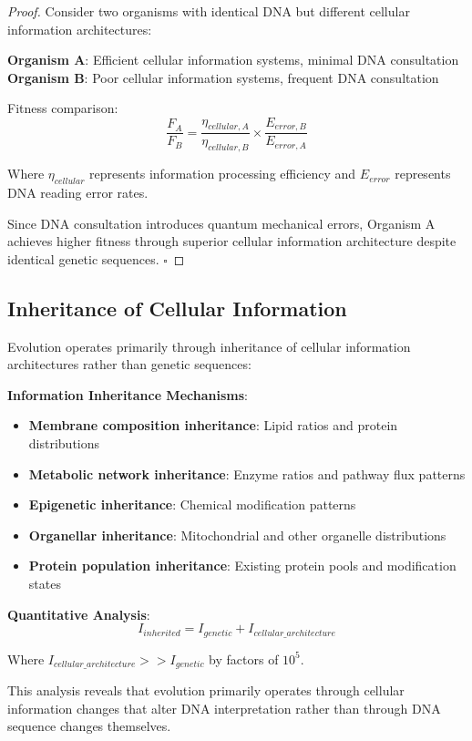 \documentclass[12pt,a4paper]{article}
\begin{document}
\begin{proof}
Consider two organisms with identical DNA but different cellular information architectures:

\textbf{Organism A}: Efficient cellular information systems, minimal DNA consultation
\textbf{Organism B}: Poor cellular information systems, frequent DNA consultation

Fitness comparison:
$$\frac{F_A}{F_B} = \frac{\eta_{cellular,A}}{\eta_{cellular,B}} \times \frac{E_{error,B}}{E_{error,A}}$$

Where $\eta_{cellular}$ represents information processing efficiency and $E_{error}$ represents DNA reading error rates.

Since DNA consultation introduces quantum mechanical errors, Organism A achieves higher fitness through superior cellular information architecture despite identical genetic sequences. $\square$
\end{proof}

\subsection{Inheritance of Cellular Information}

Evolution operates primarily through inheritance of cellular information architectures rather than genetic sequences:

\textbf{Information Inheritance Mechanisms}:
\begin{itemize}
\item \textbf{Membrane composition inheritance}: Lipid ratios and protein distributions
\item \textbf{Metabolic network inheritance}: Enzyme ratios and pathway flux patterns
\item \textbf{Epigenetic inheritance}: Chemical modification patterns
\item \textbf{Organellar inheritance}: Mitochondrial and other organelle distributions
\item \textbf{Protein population inheritance}: Existing protein pools and modification states
\end{itemize}

\textbf{Quantitative Analysis}:
$$I_{inherited} = I_{genetic} + I_{cellular\_architecture}$$

Where $I_{cellular\_architecture} >> I_{genetic}$ by factors of $10^5$.

This analysis reveals that evolution primarily operates through cellular information changes that alter DNA interpretation rather than through DNA sequence changes themselves.
\end{document}
